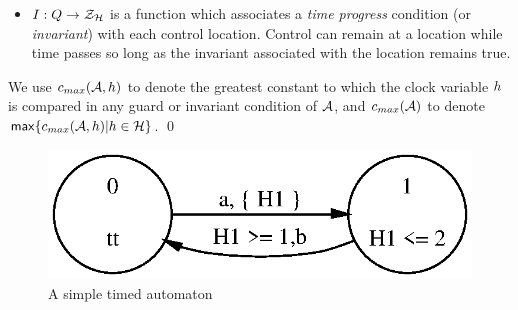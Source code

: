 {\begin{definition}
\begin{itemize}
Each edge $\tgedge \in \tgedges$ is of the form
$(\tgloc,\tgguard,a,\someclks,\tgloc')$ where $\tgloc,\tgloc' \in
\tglocs$ are control locations, denoted $\esource(\tgedge), 
\etarget(\tgedge)$, respectively; $\tgguard \in
\ClockZones$ is a clock zone, called the \emph{guard} of $\tgedge$ and 
denoted $\eguard(\tgedge)$; $a
\in \Actions$ is an action label, denoted $\elabel(\tgedge)$ and 
$\someclks \subseteq \tgclks$ is a set of clocks to be reset,
denoted $\ereset(\tgedge)$.
\item $\tginv : \tglocs \fun \ClockZones$ is a function which 
associates a \emph{time progress} condition (or \emph{invariant}) with 
each control location. Control can remain at a location while time passes 
so long as the invariant associated with the location remains true.
\end{itemize} 
We use $\cmax(\AA,\clock)$ to denote the greatest constant to which the clock
variable $h$ is compared in any guard or invariant condition of $\AA$,
and $\cmax(\AA)$ to denote $\max\{\cmax(\AA,\clock) | \clock \in \clocks\}$.
\qed
\end{definition}

\begin{figure}
\begin{center}
\includegraphics[width=.4\linewidth]{METHODS/ex1.eps}
\end{center}
\caption{A simple timed automaton\label{fig:ex1}}
\end{figure}

}
